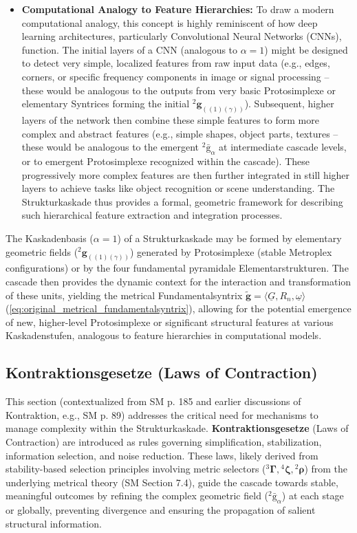\documentclass[12pt]{article}
\newcommand{\kompositionsfeld}{{}^2\bar{\mathrm{g}}}
\newcommand{\partialstruktur}[1]{{}^2\mathbf{g}_{(#1)}}
\newcommand{\fundamentalkondensor}{{}^3\bm{\Gamma}}
\newcommand{\kaskadenstufe}{\alpha}
\newcommand{\strukturkompressor}{{}^4\bm{\zeta}}
\begin{document}
\begin{itemize}
    \item \textbf{Computational Analogy to Feature Hierarchies:}
    To draw a modern computational analogy, this concept is highly reminiscent of how deep learning architectures, particularly Convolutional Neural Networks (CNNs), function. The initial layers of a CNN (analogous to \( \kaskadenstufe=1 \)) might be designed to detect very simple, localized features from raw input data (e.g., edges, corners, or specific frequency components in image or signal processing – these would be analogous to the outputs from very basic Protosimplexe or elementary Syntrices forming the initial \( \partialstruktur{(1)(\gamma)} \)). Subsequent, higher layers of the network then combine these simple features to form more complex and abstract features (e.g., simple shapes, object parts, textures – these would be analogous to the emergent \( \kompositionsfeld_\alpha \) at intermediate cascade levels, or to emergent Protosimplexe recognized within the cascade). These progressively more complex features are then further integrated in still higher layers to achieve tasks like object recognition or scene understanding. The Strukturkaskade thus provides a formal, geometric framework for describing such hierarchical feature extraction and integration processes.
\end{itemize}

The Kaskadenbasis (\(\kaskadenstufe=1\)) of a Strukturkaskade may be formed by elementary geometric fields (\(\partialstruktur{(1)(\gamma)}\)) generated by Protosimplexe (stable Metroplex configurations) or by the four fundamental pyramidale Elementarstrukturen. The cascade then provides the dynamic context for the interaction and transformation of these units, yielding the metrical Fundamentalsyntrix $\tilde{\mathbf{g}} = \langle \underline{G}, R_n, \underline{\omega} \rangle$ (\eqref{eq:original_metrical_fundamentalsyntrix}), allowing for the potential emergence of new, higher-level Protosimplexe or significant structural features at various Kaskadenstufen, analogous to feature hierarchies in computational models.

\subsection{Kontraktionsgesetze (Laws of Contraction)}
\label{sec:kontraktionsgesetze}

This section (contextualized from SM p. 185 and earlier discussions of Kontraktion, e.g., SM p. 89) addresses the critical need for mechanisms to manage complexity within the Strukturkaskade. \textbf{Kontraktionsgesetze} (Laws of Contraction) are introduced as rules governing simplification, stabilization, information selection, and noise reduction. These laws, likely derived from stability-based selection principles involving metric selectors (\(\fundamentalkondensor, \strukturkompressor, {}^2\bm{\rho}\)) from the underlying metrical theory (SM Section 7.4), guide the cascade towards stable, meaningful outcomes by refining the complex geometric field (\(\kompositionsfeld_\alpha\)) at each stage or globally, preventing divergence and ensuring the propagation of salient structural information.
\end{document}
